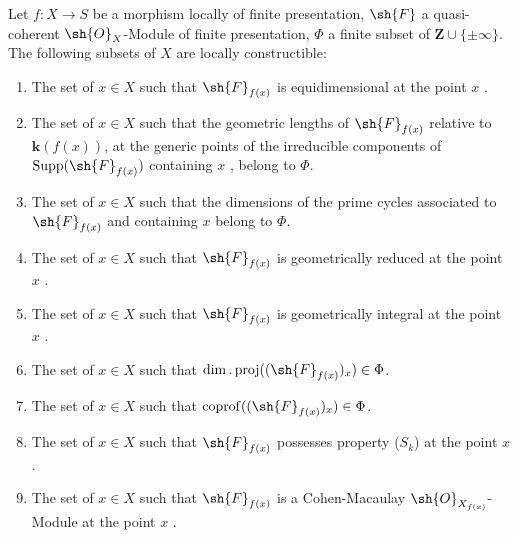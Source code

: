 \begin{proposition}[9.9.2]
\label{IV.9.9.2}
Let $f:X\to S$ be a morphism locally of finite presentation, $\sh{F}$ a quasi-coherent $\sh{O}_X$-Module of finite presentation, $\Phi$ a finite subset of $\mathbf{Z}\cup\{\pm\infty\}$.
The following subsets of $X$ are locally constructible:
\begin{enumerate}[label=(\roman*)]
  \item The set of $x\in X$ such that $\sh{F}_{f(x)}$ is equidimensional at the point $x$ .
  \item The set of $x\in X$ such that the geometric lengths of $\sh{F}_{f(x)}$ relative to $\mathbf{k}(f(x))$, at the generic points of the irreducible components of $\operatorname{Supp}(\sh{F}_{f(x)})$ containing $x$ , belong to $\Phi$.
  \item The set of $x\in X$ such that the dimensions of the prime cycles associated to $\sh{F}_{f(x)}$ and containing $x$ belong to $\Phi$.
  \item The set of $x\in X$ such that $\sh{F}_{f(x)}$ is geometrically reduced at the point $x$ .
  \item The set of $x\in X$ such that $\sh{F}_{f(x)}$ is geometrically integral at the point $x$ .
  \item The set of $x\in X$ such that $\dim.\operatorname{proj}((\sh{F}_{f(x)})_x)\in\Phi$.
  \item The set of $x\in X$ such that $\operatorname{coprof}((\sh{F}_{f(x)})_x)\in\Phi$.
  \item The set of $x\in X$ such that $\sh{F}_{f(x)}$ possesses property ($S_k$) at the point $x$ .
  \item The set of $x\in X$ such that $\sh{F}_{f(x)}$ is a Cohen-Macaulay $\sh{O}_{X_{f(x)}}$-Module at the point $x$ .
\end{enumerate}
\end{proposition}

